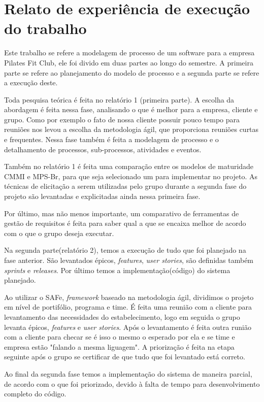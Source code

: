 \section[Relato de experiência de execução do trabalho]{Relato de experiência de execução do trabalho}
Este trabalho se refere a modelagem de processo de um software para a empresa
Pilates Fit Club, ele foi divido em duas partes ao longo do semestre. A primeira
parte se refere ao planejamento do modelo de processo e a segunda parte se
refere a execução deste.

Toda pesquisa teórica é feita no relatório 1 (primeira parte). A escolha da
abordagem é feita nessa fase, analisando o que é melhor para a empresa, cliente
e grupo. Como por exemplo o fato de nossa cliente possuir pouco tempo para
reuniões nos levou a escolha da metodologia ágil, que proporciona reuniões
curtas e frequentes. Nessa fase também é feita a modelagem de processo e o
detalhamento de processos, sub-processos, atividades e eventos.

Também no relatório 1 é feita uma comparação entre os modelos de maturidade CMMI
e MPS-Br, para que seja selecionado um para implementar no projeto. As técnicas
de elicitação a serem utilizadas pelo grupo durante a segunda fase do projeto
são levantadas e explicitadas ainda nessa primeira fase.

Por último, mas não menos importante, um comparativo de ferramentas de gestão de
requisitos é feita para saber qual a que se encaixa melhor de acordo com o que
o grupo deseja executar.

Na segunda parte(relatório 2), temos a execução de tudo que foi planejado na
fase anterior. São levantados épicos, \textsl{features}, \textsl{user stories},
são definidas também \textsl{sprints} e \textsl{releases}. Por último temos a
implementação(código) do sistema planejado.

Ao utilizar o SAFe, \textsl{framework} baseado na metodologia ágil,
dividimos o projeto em nível de portifólio, programa e time. É feita uma reunião
com a cliente para levantamento das necessidades do estabelecimento,
logo em seguida o grupo levanta épicos, \textsl{features} e
\textsl{user stories}. Após o levantamento é feita outra runião com a cliente
para checar se é isso o mesmo o esperado por ela e se time e empresa estão
"falando a mesma liguagem". A priorização é feita na etapa seguinte após o grupo
se certificar de que tudo que foi levantado está correto.

Ao final da segunda fase temos a implementação do sistema de maneira parcial, de
acordo com o que foi priorizado, devido à falta de tempo para desenvolvimento
completo do código.
